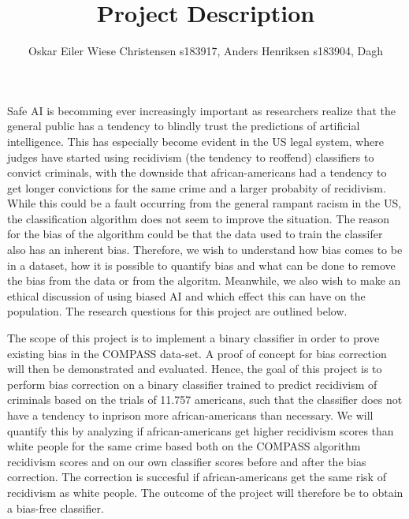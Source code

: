 \documentclass[11pt, fleqn]{article}
\title{Project Description}
\author{Oskar Eiler Wiese Christensen s183917, Anders Henriksen s183904, Dagh}
\begin{document}
	\maketitle
	\newpage
	
	\noindent
	Safe AI is becomming ever increasingly important as researchers realize that the general public has a tendency to blindly trust the predictions of artificial intelligence. This has especially become evident in the US legal system, where judges have started using recidivism (the tendency to reoffend) classifiers to convict criminals, with the downside that african-americans had a tendency to get longer convictions for the same crime and a larger probabity of recidivism. While this could be a fault occurring from the general rampant racism in the US, the classification algorithm does not seem to improve the situation. The reason for the bias of the algorithm could be that the data used to train the classifer also has an inherent bias. Therefore, we wish to understand how bias comes to be in a dataset, how it is possible to quantify bias and what can be done to remove the bias from the data or from the algoritm. Meanwhile, we also wish to make an ethical discussion of using biased AI and which effect this can have on the population. The research questions for this project are outlined below. 
	
	The scope of this project is to implement a binary classifier in order to prove existing bias in the COMPASS data-set. A proof of concept for bias correction will then be demonstrated and evaluated. Hence, the goal of this project is to perform bias correction on a binary classifier trained to predict recidivism of criminals based on the trials of 11.757 americans, such that the classifier does not have a tendency to inprison more african-americans than necessary. We will quantify this by analyzing if african-americans get higher recidivism scores than white people for the same crime based both on the COMPASS algorithm recidivism scores and on our own classifier scores before and after the bias correction. The correction is succesful if african-americans get the same risk of recidivism as white people. The outcome of the project will therefore be to obtain a bias-free classifier.
	
	
\end{document}
